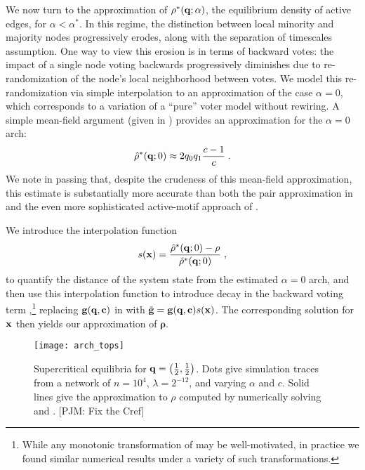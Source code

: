 \documentclass[review, onefignum, onetabnum]{siamart171218}
\newcommand{\pjm}[1]{{\color{blue}[PJM: #1]}}
\begin{document}
		We now turn to the approximation of $\rho^*(\mathbf{q};\alpha)$, the equilibrium density of active edges, for $\alpha < \alpha^*$. 
		In this regime, the distinction between local minority and majority nodes progressively erodes, along with the separation of timescales assumption. 
		One way to view this erosion is in terms of backward votes: the impact of a single node voting backwards progressively diminishes due to re-randomization of the node's local neighborhood between votes. 
		We model this re-randomization via simple interpolation to an approximation of the case $\alpha = 0$, which corresponds to a variation of a ``pure'' voter model without rewiring. 
		A simple mean-field argument (given in ) provides an approximation for the $\alpha = 0$ arch:
		\begin{align}
			\hat{\rho}^*(\q; 0) \approx 2q_0q_1\frac{c-1}{c}\;. \label{eq:alpha_0}
		\end{align}
		We note in passing that, despite the crudeness of this mean-field approximation, this estimate is substantially more accurate than both the pair approximation in \cite{Durrett2012} and the even more sophisticated active-motif approach of \cite{Demirel2012}. 

		We introduce the interpolation function 
		\begin{align}
			s(\x) = \frac{\hat{\rho}^*(\q;0) - \rho}{\hat{\rho}^*(\q;0)}\;, \label{eq:interpolation}
		\end{align}
		to quantify the distance of the system state from the estimated $\alpha = 0$ arch, and then use this interpolation function to introduce decay in the backward voting term  ,\footnote{While any monotonic transformation of   may be well-motivated, in practice we found similar numerical results under a variety of such transformations.}
		replacing $\mathbf{g}(\mathbf{q}, \mathbf{c})$ in  with $\tilde{\mathbf{g}} = \mathbf{g}(\mathbf{q}, \mathbf{c})s(\mathbf{x})$.
		The corresponding solution for $\mathbf{x}$ then yields our approximation of $\mathbf{\rho}$. 
		\begin{figure}
			\centering
				\texttt{[image: arch\_tops]}
			\caption{Supercritical equilibria for $\mathbf{q} = \left(\frac{1}{2}, \frac{1}{2}\right)$.
			Dots give simulation traces from a network of $n = 10^4$, $\lambda = 2^{-12}$, and varying $\alpha$ and $c$.
			Solid lines give the approximation to $\rho$ computed by numerically solving  and . \pjm{Fix the Cref}} \label{fig:arch_tops}
		\end{figure}
		
\end{document}
